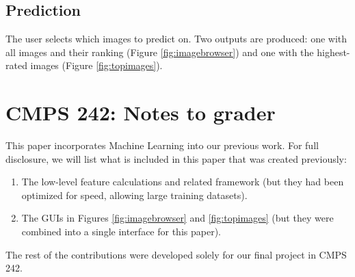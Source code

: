 \documentclass[11pt,letter]{article}
\begin{document}
\subsection{Prediction}
The user selects which images to predict on. Two outputs are produced: one with all images and their ranking (Figure \ref{fig:imagebrowser}) and one with the highest-rated images (Figure \ref{fig:topimages}).

\begin{figure*}[h!]
  \centering
  \caption{This interface shows the list of images with some of their low-level rankings and final prediction.}
  \label{fig:imagebrowser}
\end{figure*}

\begin{figure*}[h!]
  \centering
  \caption{This is a quick view of the top twelve images, as rated by the application.}
  \label{fig:topimages}
\end{figure*}

\section{CMPS 242: Notes to grader}
This paper incorporates Machine Learning into our previous work. For full disclosure, we will list what is included in this paper that was created previously:

\begin{enumerate}
\item The low-level feature calculations and related framework (but they had been optimized for speed, allowing large training datasets).
\item The GUIs in Figures \ref{fig:imagebrowser} and \ref{fig:topimages} (but they were combined into a single interface for this paper).
\end{enumerate}

The rest of the contributions were developed solely for our final project in CMPS 242.



\end{document}
